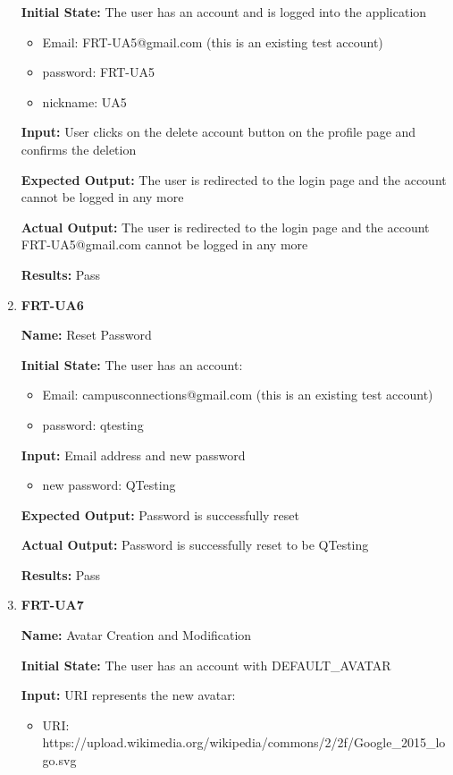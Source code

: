 \documentclass[12pt, titlepage]{article}
\begin{document}
\begin{enumerate}
\textbf{Initial State:} The user has an account and is logged into the application
\begin{itemize}
\item Email: FRT-UA5@gmail.com (this is an existing test account)
\item password: FRT-UA5
\item nickname: UA5
\end{itemize}

\textbf{Input:} User clicks on the delete account button on the profile page and confirms the deletion
					
\textbf{Expected Output:} The user is redirected to the login page and the account cannot be logged in any more

\textbf{Actual Output:} The user is redirected to the login page and the account FRT-UA5@gmail.com cannot be logged in any more

\textbf{Results:} Pass

\item \textbf{FRT-UA6}

\textbf{Name:} Reset Password

\textbf{Initial State:} The user has an account:
\begin{itemize}
\item Email: campusconnections@gmail.com (this is an existing test account)
\item password: qtesting
\end{itemize}

\textbf{Input:} Email address and new password
\begin{itemize}
\item new password: QTesting
\end{itemize}
					
\textbf{Expected Output:} Password is successfully reset

\textbf{Actual Output:} Password is successfully reset to be QTesting

\textbf{Results:} Pass

\item \textbf{FRT-UA7}

\textbf{Name:} Avatar Creation and Modification

\textbf{Initial State:} The user has an account with DEFAULT\_AVATAR

\textbf{Input:} URI represents the new avatar:
\begin{itemize}
\item URI: https://upload.wikimedia.org/wikipedia/commons/2/2f/Google\_2015\_logo.svg
\end{itemize}
					

\end{enumerate}
\end{document}
